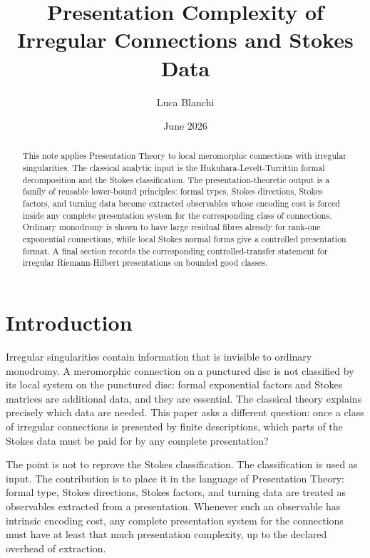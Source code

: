 \documentclass[11pt]{article}
\title{Presentation Complexity of Irregular Connections and Stokes Data}
\author{Luca Blanchi}
\date{June 2026}
\begin{document}
\maketitle

\begin{abstract}
This note applies Presentation Theory to local meromorphic connections with irregular singularities.  The classical analytic input is the Hukuhara-Levelt-Turrittin formal decomposition and the Stokes classification.  The presentation-theoretic output is a family of reusable lower-bound principles: formal types, Stokes directions, Stokes factors, and turning data become extracted observables whose encoding cost is forced inside any complete presentation system for the corresponding class of connections.  Ordinary monodromy is shown to have large residual fibres already for rank-one exponential connections, while local Stokes normal forms give a controlled presentation format.  A final section records the corresponding controlled-transfer statement for irregular Riemann-Hilbert presentations on bounded good classes.
\end{abstract}

\section{Introduction}

Irregular singularities contain information that is invisible to ordinary monodromy.  A meromorphic connection on a punctured disc is not classified by its local system on the punctured disc: formal exponential factors and Stokes matrices are additional data, and they are essential.  The classical theory explains precisely which data are needed.  This paper asks a different question: once a class of irregular connections is presented by finite descriptions, which parts of the Stokes data must be paid for by any complete presentation?

The point is not to reprove the Stokes classification.  The classification is used as input.  The contribution is to place it in the language of Presentation Theory: formal type, Stokes directions, Stokes factors, and turning data are treated as observables extracted from a presentation.  Whenever such an observable has intrinsic encoding cost, any complete presentation system for the connections must have at least that much presentation complexity, up to the declared overhead of extraction.
\end{document}
